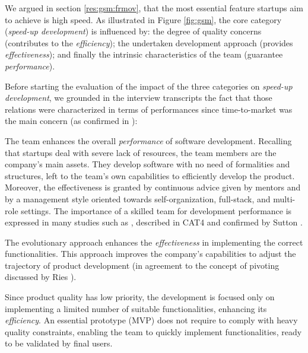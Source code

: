 \documentclass[10pt,journal,letterpaper,compsoc]{IEEEtran}
\begin{document}
We argued in section \ref{res:gsm:frmov}, that the most essential feature 
startups aim to achieve is high speed. As illustrated in Figure \ref{fig:gsm}, 
the core category (\textit{speed-up development}) is influenced by: the degree 
of quality concerns (contributes to the \textit{efficiency}); the undertaken 
development approach (provides \textit{effectiveness}); and finally the 
intrinsic characteristics of the team (guarantee \textit{performance}). 

Before starting the evaluation of the impact of the three categories on 
\textit{speed-up development}, we grounded in the interview transcripts the fact 
that those relations were characterized in terms of performances since 
time-to-market was the main concern (as confirmed in \cite{SMS}):

\begin{compactitem}

\item The team enhances the overall \textit{performance} of software 
development. Recalling that startups deal with severe lack of resources, the 
team members are the company's main assets. They develop software with no need 
of formalities and structures, left to the team's own capabilities to 
efficiently develop the product. Moreover, the effectiveness is granted by 
continuous advice given by mentors and by a management style oriented towards 
self-organization, full-stack, and multi-role settings. The importance of a 
skilled team for development performance is expressed in many studies such as 
\cite{surviving-os-cockburn, Highsmith2000}, described in CAT4 and confirmed by 
Sutton \cite{Sutton2000}.
\item The evolutionary approach enhances the \textit{effectiveness} in 
implementing the correct functionalities. This approach improves the company's 
capabilities to adjust the trajectory of product development (in agreement to 
the concept of pivoting discussed by Ries \cite{Ries2011}).
\item Since product quality has low priority, the development is focused only on 
implementing a limited number of suitable functionalities, enhancing its 
\textit{efficiency}. An essential prototype (MVP) does not require to comply 
with heavy quality constraints, enabling the team to quickly implement 
functionalities, ready to be validated by final users.
\end{compactitem}
\end{document}
